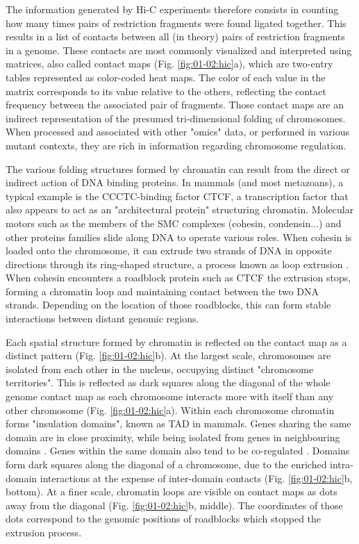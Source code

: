 The information generated by Hi-C experiments therefore consists in counting how many times pairs of restriction fragments were found ligated together. This results in a list of contacts between all (in theory) pairs of restriction fragments in a genome. These contacts are most commonly visualized and interpreted using matrices, also called contact maps (Fig. \ref{fig:01-02:hic}a), which are two-entry tables represented as color-coded heat maps. The color of each value in the matrix corresponds to its value relative to the others, reflecting the contact frequency between the associated pair of fragments. Those contact maps are an indirect representation of the presumed tri-dimensional folding of chromosomes. When processed and associated with other "omics" data, or performed in various mutant contexts, they are rich in information regarding chromosome regulation.

The various folding structures formed by chromatin can result from the direct or indirect action of DNA binding proteins. In mammals (and most metazoans), a typical example is the CCCTC-binding factor \acrfull{CTCF}, a transcription factor that also appears to act as an "architectural protein" structuring chromatin. Molecular motors such as the members of the \acrfull{SMC} complexes (cohesin, condensin...) and other proteins families slide along DNA to operate various roles. When cohesin is loaded onto the chromosome, it can extrude two strands of DNA in opposite directions through its ring-shaped structure, a process known as loop extrusion \cite{fudenbergFormationChromosomalDomains2016}. When cohesin encounters a roadblock protein such as \acrshort{CTCF} the extrusion stops, forming a chromatin loop and maintaining contact between the two DNA strands. Depending on the location of those roadblocks, this can form stable interactions between distant genomic regions. 


Each spatial structure formed by chromatin is reflected on the contact map as a distinct pattern (Fig. \ref{fig:01-02:hic}b). At the largest scale, chromosomes are isolated from each other in the nucleus, occupying distinct "chromosome territories". This is reflected as dark squares along the diagonal of the whole genome contact map as each chromosome interacts more with itself than any other chromosome (Fig. \ref{fig:01-02:hic}a). Within each chromosome chromatin forms "insulation domains", known as \acrfull{TAD} in mammals. Genes sharing the same domain are in close proximity, while being isolated from genes in neighbouring domains . Genes within the same domain also tend to be co-regulated \cite{noraSpatialPartitioningRegulatory2012}. Domains form dark squares along the diagonal of a chromosome, due to the enriched intra-domain interactions at the expense of inter-domain contacts (Fig. \ref{fig:01-02:hic}b, bottom). At a finer scale, chromatin loops are visible on contact maps as dots away from the diagonal (Fig. \ref{fig:01-02:hic}b, middle). The coordinates of those dots correspond to the genomic positions of roadblocks which stopped the extrusion process.



